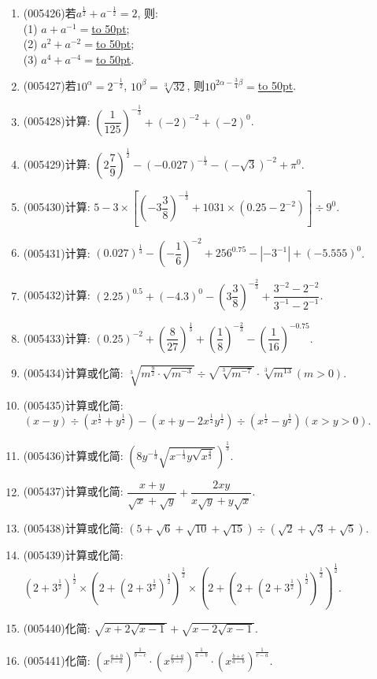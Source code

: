 \documentclass[10pt,a4paper]{article}
\newcommand{\blank}[1]{\underline{\hbox to #1pt{}}}
\begin{document}
\begin{enumerate}[1.]
\item {\tiny (005426)}若$a^{\frac 12}+a^{-\frac 12}=2$, 则:\\
(1) $a+a^{-1}=$\blank{50};\\
(2) $a^2+a^{-2}=$\blank{50};\\
(3) $a^4+a^{-4}=$\blank{50}.
\item {\tiny (005427)}若$10^{\alpha }=2^{-\frac 12}$, $10^{\beta }=\sqrt [3]{32}$, 则$10^{2\alpha -\frac 34\beta }=$\blank{50}.
\item {\tiny (005428)}计算: $(\dfrac 1{125})^{-\frac 13}+(-2)^{-2}+(-2)^0$.
\item {\tiny (005429)}计算: $(2\dfrac 79)^{\frac 12}-(-0.027)^{-\frac 13}-(-\sqrt 3)^{-2}+\pi ^0$.
\item {\tiny (005430)}计算: $5-3\times [ (-3\dfrac 38)^{-\frac 13}+1031\times (0.25-2^{-2}) ]\div 9^0$.
\item {\tiny (005431)}计算: $(0.027)^{\frac 13}-(-\dfrac 16)^{-2}+256^{0.75}-|-3^{-1}|+(-5.555)^0$.
\item {\tiny (005432)}计算: $(2.25)^{0.5}+(-4.3)^0-(3\dfrac 38)^{-\frac 23}+\dfrac{3^{-2}-2^{-2}}{3^{-1}-2^{-1}}$.
\item {\tiny (005433)}计算: $(0.25)^{-2}+(\dfrac 8{27})^{\frac 13}+(\dfrac 18)^{-\frac 23}-(\dfrac 1{16})^{-0.75}$.
\item {\tiny (005434)}计算或化简: $\sqrt [3]{m^{\frac 92}\cdot \sqrt {m^{-3}}}\div \sqrt {\sqrt [3]{m^{-7}}}\cdot \sqrt [3]{m^{13}}(m>0)$.
\item {\tiny (005435)}计算或化简: $(x-y)\div (x^{\frac 12}+y^{\frac 12})-(x+y-2x^{\frac 12}y^{\frac 12})\div (x^{\frac 12}-y^{\frac 12})(x>y>0)$.
\item {\tiny (005436)}计算或化简: $(8y^{-\frac 13}\sqrt {x^{-\frac 13}y\sqrt {x^{\frac 43}}})^{\frac 13}$.
\item {\tiny (005437)}计算或化简: $\dfrac{x+y}{\sqrt x+\sqrt y}+\dfrac{2xy}{x\sqrt y+y\sqrt x}$.
\item {\tiny (005438)}计算或化简: $(5+\sqrt 6+\sqrt {10}+\sqrt {15})\div (\sqrt 2+\sqrt 3+\sqrt 5)$.
\item {\tiny (005439)}计算或化简: $(2+3^\frac 12)^\frac 12\times (2+(2+3^\frac 12)^\frac 12)^\frac 12\times (2+(2+(2+3^\frac 12)^\frac 12)^\frac 12)^\frac 12$.
\item {\tiny (005440)}化简: $\sqrt {x+2\sqrt {x-1}}+\sqrt {x-2\sqrt {x-1}}$.
\item {\tiny (005441)}化简: $(x^{\frac{a+b}{c-a}})^{\frac 1{b-c}}\cdot (x^{\frac{x+a}{b-c}})^{\frac 1{a-b}}\cdot (x^{\frac{b+c}{a-b}})^{\frac 1{c-a}}$.

\end{enumerate}
\end{document}

